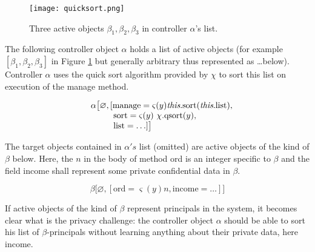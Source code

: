 \documentclass[10pt, conference, compsocconf]{IEEEtran}
\begin{document}
{\begin{figure}
\vspace{-5ex}
\begin{center}
\texttt{[image: quicksort.png]}
\end{center}
\vspace{-3ex}
\caption{Three active objects $\beta_1, \beta_2, \beta_3$ in controller $\alpha$'s list.}
\label{fig:qsort}
\vspace{-5ex}
\end{figure}


The following controller object $\alpha$ holds a list of active objects (for example
$[\beta_1, \beta_2, \beta_3]$ in Figure \ref{fig:qsort} but generally arbitrary thus represented
as \dots below). Controller $\alpha$ uses the quick sort algorithm provided by $\chi$ to sort this list on execution
of the manage method.

\begin{small}
\[
 \begin{array}{ll}
   & \alpha \big[\varnothing, [ \text{manage} = \varsigma(y) \text{{\it this}.sort({\it this}.list)}, \\
  & \  \qquad\ \text{sort} = \varsigma(y)\ \chi.\text{qsort}(y),\\
  & \  \qquad\ \text{list} = \ldots ] \big]
 \end{array}
\]
\end{small}

The target objects contained in $\alpha's$ list (omitted) are active objects of the
kind of $\beta$ below. Here, the $n$ in the body of method ord is an integer specific to $\beta$
and the field income shall represent some private confidential data in $\beta$. 

\begin{small}
\[
 \beta \big[\varnothing,[ \text{ord} = \varsigma(y) n, \text{income} = \ldots ] \big]
\]
\end{small}

If active objects of the kind of $\beta$ represent principals in the system,
it becomes clear what is the privacy challenge: the controller object $\alpha$ should be able to
sort his list of $\beta$-principals without learning anything about their
private data, here income. 


}
\end{document}
